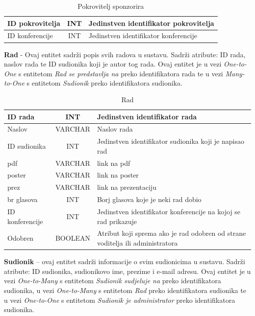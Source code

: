 \begin{table}[H]
	\caption{Pokrovitelj sponzorira}
	\label{tbl:pokroviteljSponzorira}
	\centering
	\begin{tabular}{|l|c|l|} 
		\hline
		\cellcolor{lightblue}ID pokrovitelja & INT & Jedinstven identifikator pokrovitelja\\ 
		\hline
		\cellcolor{lightblue}ID konferencije & INT & Jedinstven identifikator konferencije\\ 
		\hline
	\end{tabular}
\end{table}

\textbf{Rad} - Ovaj entitet sadrži popis svih radova u sustavu. Sadrži atribute: ID rada, naslov rada te ID sudionika koji je autor tog rada. Ovaj entitet je u vezi \textit{One-to-One} s entitetom \textit{Rad se predstavlja na} preko identifikatora rada te u vezi \textit{Many-to-One} s entitetom \textit{Sudionik} preko identifikatora sudionika.

\begin{table}[H]
	\caption{Rad}
	\label{tbl:rad}
	\centering
	\begin{tabular}{|l|c|l|} 
		\hline
		\cellcolor{lightgreen}ID rada & INT & Jedinstven identifikator rada\\ 
		\hline
		Naslov & VARCHAR & Naslov rada\\ 
		\hline
		\cellcolor{lightblue}ID sudionika & INT & Jedinstven identifikator sudionika koji je napisao rad\\ 
		\hline
		pdf & VARCHAR & link na pdf\\ 
		\hline
		poster & VARCHAR & link na poster\\ 
		\hline
		prez & VARCHAR & link na prezentaciju\\ 
		\hline
		br glasova & INT & Borj glasova koje je neki rad dobio\\ 
		\hline
		\cellcolor{lightblue}ID konferencije & INT & Jedinstven identifikator konferencije na kojoj se rad prikazuje\\ 
		\hline
		Odobren & BOOLEAN & Atribut koji sprema ako je rad odobren od strane voditelja ili administratora\\ 
		\hline
	\end{tabular}
\end{table}

\textbf{Sudionik} – ovaj entitet sadrži informacije o svim sudionicima u sustavu. Sadrži atribute: ID sudionika, sudionikovo ime, prezime i e-mail adresu. Ovaj entitet je u vezi \textit{One-to-Many} s entitetom \textit{Sudionik sudjeluje na} preko identifikatora sudionika, u vezi \textit{One-to-Many} s entitetom \textit{Rad} preko identifikatora sudionika te u vezi \textit{One-to-One} s entitetom \textit{Sudionik je administrator} preko identifikatora sudionika.

